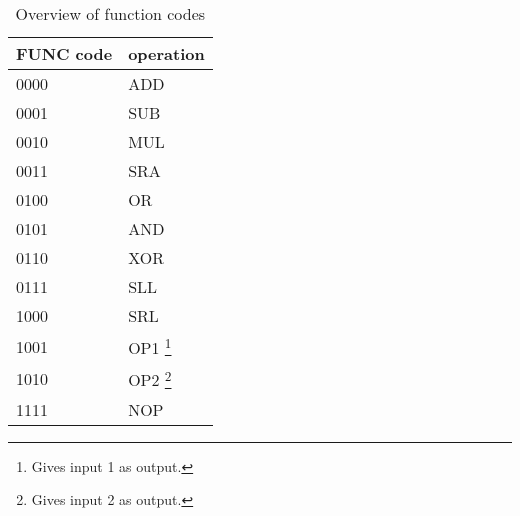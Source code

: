 \begin{savenotes}
\begin{table}
\centering
    \begin{tabular}{| l | l |}
     \hline
     FUNC code & operation \\
     \hline
     0000      & ADD       \\
     0001      & SUB       \\
     0010      & MUL       \\
     0011      & SRA       \\
     0100      & OR        \\
     0101      & AND       \\
     0110      & XOR       \\
     0111      & SLL       \\
     1000      & SRL       \\
     1001      & OP1 \footnote{Gives input 1 as output.}       \\
     1010      & OP2 \footnote{Gives input 2 as output.}      \\
     1111      & NOP       \\
     \hline
   \end{tabular}
    \caption{Overview of function codes}
    \label{fpga:tbl:alu_function_codes_tbl}



\end{table}
\end{savenotes}